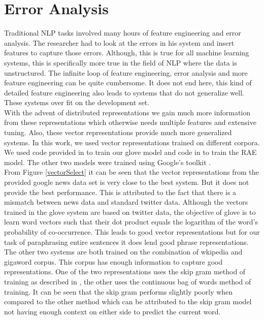 \documentclass[conference]{IEEEtran}
\begin{document}
\section{Error Analysis}
\label{error}
Traditional NLP tasks involved many hours of feature engineering and error analysis. The researcher had to look at the errors in his system and insert features to capture those errors. Although, this is true for all machine learning systems, this is specifically more true in the field of NLP where the data is unstructured. The infinite loop of feature engineering, error analysis and more feature engineering can be quite cumbersome. It does not end here, this kind of detailed feature engineering also leads to systems that do not generalize well. These systems over fit on the development set.\\

\indent With the advent of distributed representations we gain much more information from these representations which otherwise needs multiple features and extensive tuning. Also, these vector representations provide much more generalized systems. In this work, we used vector representations trained on different corpora. We used code provided in \cite{GloVe} to train our glove model and code in \cite{Wordvec} to train the RAE model. The other two models were trained using Google's toolkit \cite{word2vec}.\\

\indent From Figure \ref{vectorSelect} it can be seen that the vector representations from the provided google news data set is very close to the best system. But it does not provide the best performance. This is attributed to the fact that there is a mismatch between news data and standard twitter data. Although the vectors trained in the glove system are based on twitter data, the objective of glove is to learn word vectors such that their dot product equals the logarithm of the word's probability of co-occurrence. This leads to good vector representations but for our task of paraphrasing entire sentences it does lend good phrase representations. The other two systems are both trained on the combination of wkipedia and gigaword corpus. This corpus has enough information to capture good representations. One of the two representations uses the skip gram method of training as described in \cite{Mikolov}, the other uses the continuous bag of words method of training. It can be seen that the skip gram performs slightly poorly when compared to the other method which can be attributed to the skip gram model not having enough context on either side to predict the current word.\\
\end{document}
